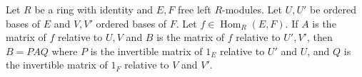 Let $R$ be a ring with identity and $E,F$ free left $R$-modules. Let $U,U'$ be ordered bases of $E$ and $V,V'$ ordered bases of $F$. Let $f \in \operatorname{Hom}_R(E,F)$. If $A$ is the matrix of $f$ relative to $U,V$ and $B$ is the matrix of $f$ relative to $U',V'$, then $B = PAQ$ where $P$ is the invertible matrix of $1_E$ relative to $U'$ and $U$, and $Q$ is the invertible matrix of $1_F$ relative to $V$ and $V'$.
